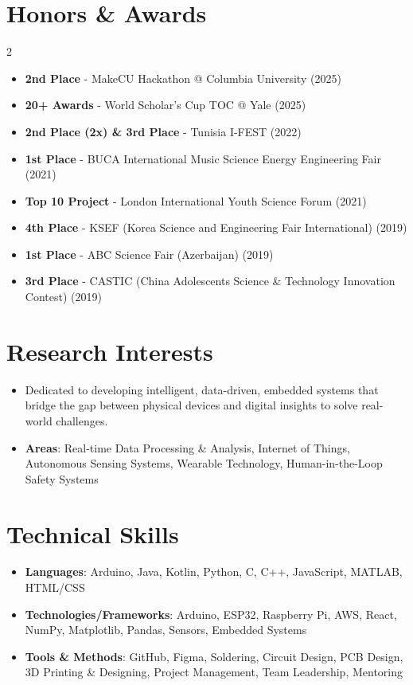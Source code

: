 \documentclass[letterpaper,11pt]{article}
\newcommand{\resumeItem}[1]{
  \item\small{
    {#1}
  }
}
\newcommand{\resumeItemListStart}{\begin{itemize}[itemsep=0pt, parsep=0pt]}
\newcommand{\resumeItemListEnd}{\end{itemize}\vspace{-5pt}}
\begin{document}
\section{Honors \& Awards}
        \begin{multicols}{2}
            \begin{itemize}[itemsep=0pt, parsep=0pt]
              \item \textbf{2nd Place} - MakeCU Hackathon @ Columbia University (2025)
              \item \textbf{20+ Awards} - World Scholar's Cup TOC @ Yale (2025)
              \item \textbf{2nd Place (2x) \& 3rd Place} - Tunisia I-FEST (2022)
              \item \textbf{1st Place} - BUCA International Music Science Energy Engineering Fair (2021)
              \item \textbf{Top 10 Project} - London International Youth Science Forum (2021)
              \item \textbf{4th Place} - KSEF (Korea Science and Engineering Fair International) (2019)
              \item \textbf{1st Place} - ABC Science Fair (Azerbaijan) (2019)
              \item \textbf{3rd Place} - CASTIC (China Adolescents Science \& Technology Innovation Contest) (2019)
            \end{itemize}
        \end{multicols}
\section{Research Interests}
  \resumeItemListStart
    \resumeItem{Dedicated to developing intelligent, data-driven, embedded systems that bridge the gap between physical devices and digital insights to solve real-world challenges.}
    \resumeItem{\textbf{Areas}{: Real-time Data Processing \& Analysis, Internet of Things, Autonomous Sensing Systems, Wearable Technology, Human-in-the-Loop Safety Systems}}
  \resumeItemListEnd
\section{Technical Skills}
  \resumeItemListStart
    \resumeItem{\textbf{Languages}{: Arduino, Java, Kotlin, Python, C, C++, JavaScript, MATLAB, HTML/CSS}}
    \resumeItem{\textbf{Technologies/Frameworks}{: Arduino, ESP32, Raspberry Pi, AWS, React, NumPy, Matplotlib, Pandas, Sensors, Embedded Systems}}
    \resumeItem{\textbf{Tools \& Methods}{: GitHub, Figma, Soldering, Circuit Design, PCB Design, 3D Printing \& Designing, Project Management, Team Leadership, Mentoring}}
  \resumeItemListEnd
\end{document}
